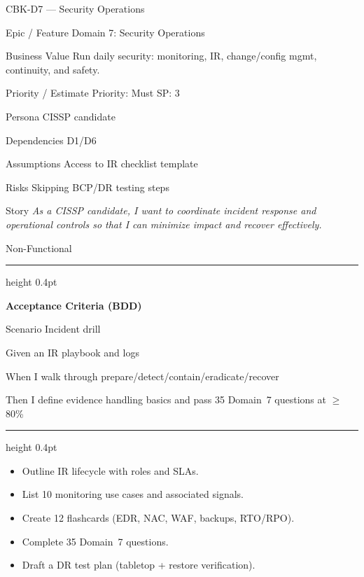 \documentclass[11pt,a4paper]{article}
\providecommand{\square}{\fbox{\rule{0pt}{0.85ex}\rule{0.85ex}{0pt}}}%
\newcommand{\citem}{\item[$\square$]}
\newcommand{\Tag}[1]{\tcbox[on line, colback=PillBack, colframe=PillBack,
  coltext=PillText, boxrule=0pt, arc=2mm, left=2pt, right=2pt, top=1pt, bottom=1pt]{\small #1}}
\newcommand{\ThinRule}{\par\vspace{4pt}\hrule height 0.4pt\par\vspace{4pt}}
\begin{document}
\clearpage
\begin{StoryCardBox}{CBK-D7 --- Security Operations}
\begin{metadesc}
\item[Epic / Feature] Domain 7: Security Operations
\item[Business Value] Run daily security: monitoring, IR, change/config mgmt, continuity, and safety.
\item[Priority / Estimate] Priority: Must \quad SP: 3
\item[Persona] CISSP candidate
\item[Dependencies] D1/D6
\item[Assumptions] Access to IR checklist template
\item[Risks] Skipping BCP/DR testing steps
\item[Story] \textit{As a CISSP candidate, I want to coordinate incident response and operational controls so that I can minimize impact and recover effectively.}
\item[Non-Functional] \Tag{Security} \Tag{Reliability}
\end{metadesc}

\ThinRule
\textbf{Acceptance Criteria (BDD)}
\begin{metadesc}
\item[Scenario] Incident drill
\item[Given] an IR playbook and logs
\item[When] I walk through prepare/detect/contain/eradicate/recover
\item[Then] I define evidence handling basics and pass 35 Domain~7 questions at $\geq$ 80\%
\end{metadesc}

\ThinRule
\begin{TasksBox}
\begin{itemize}
  \citem Outline IR lifecycle with roles and SLAs.
  \citem List 10 monitoring use cases and associated signals.
  \citem Create 12 flashcards (EDR, NAC, WAF, backups, RTO/RPO).
  \citem Complete 35 Domain~7 questions.
  \citem Draft a DR test plan (tabletop + restore verification).
\end{itemize}
\end{TasksBox}
\end{StoryCardBox}
\end{document}
